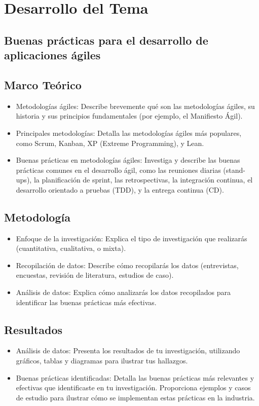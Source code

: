 \documentclass[12pt]{article}
\begin{document}
\section{Desarrollo del Tema}

\subsection*{Buenas prácticas para el desarrollo de aplicaciones ágiles}

\subsection*{Marco Teórico}
\begin{itemize}
    \item Metodologías ágiles: Describe brevemente qué son las metodologías ágiles, su historia y sus principios fundamentales (por ejemplo, el Manifiesto Ágil).
    \item Principales metodologías: Detalla las metodologías ágiles más populares, como Scrum, Kanban, XP (Extreme Programming), y Lean.
    \item Buenas prácticas en metodologías ágiles: Investiga y describe las buenas prácticas comunes en el desarrollo ágil, como las reuniones diarias (stand-ups), la planificación de sprint, las retrospectivas, la integración continua, el desarrollo orientado a pruebas (TDD), y la entrega continua (CD).
\end{itemize}

\subsection*{Metodología}
\begin{itemize}
    \item Enfoque de la investigación: Explica el tipo de investigación que realizarás (cuantitativa, cualitativa, o mixta).
    \item Recopilación de datos: Describe cómo recopilarás los datos (entrevistas, encuestas, revisión de literatura, estudios de caso).
    \item Análisis de datos: Explica cómo analizarás los datos recopilados para identificar las buenas prácticas más efectivas.
\end{itemize}

\subsection*{Resultados}
\begin{itemize}
    \item Análisis de datos: Presenta los resultados de tu investigación, utilizando gráficos, tablas y diagramas para ilustrar tus hallazgos.
    \item Buenas prácticas identificadas: Detalla las buenas prácticas más relevantes y efectivas que identificaste en tu investigación. Proporciona ejemplos y casos de estudio para ilustrar cómo se implementan estas prácticas en la industria.
\end{itemize}
\end{document}
